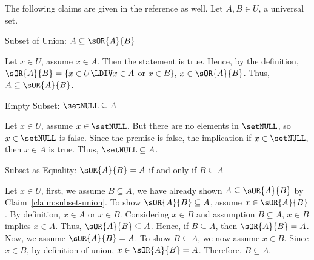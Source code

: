 \newpage

The following claims are given in the reference as well. Let $A,B\in U$, a universal set.

\begin{claim}{Subset of Union: $A \subseteq \sOR{A}{B}$}
  \label{claim:subset-union}
  \begin{subprove}[bluecolor]
      Let $x\in U$, assume $x\in A$. Then the statement  is true.
      Hence, by the definition, $\sOR{A}{B}=\{x\in U\LDIV x\in A$ or $x\in B\}$, $x\in \sOR{A}{B}$.
      Thus, $A \subseteq \sOR{A}{B}$.
  \end{subprove}
\end{claim}

\begin{claim}{Empty Subset: $\setNULL \subseteq A$}
  \label{claim:empty-subset}
  \begin{subprove}[bluecolor]
      Let $x\in U$, assume $x\in \setNULL$. But there are no elements in $\setNULL$, so
      $x\in \setNULL$ is false. Since the premise is false, the implication if $x\in \setNULL$,
      then $x\in A$ is true. Thus, $\setNULL \subseteq A$.
  \end{subprove}
\end{claim}

\begin{claim}{Subset as Equality: $\sOR{A}{B}=A$ if and only if $B\subseteq A$}
  \label{claim:subset-equality}
  \begin{subprove}[bluecolor]
      Let $x\in U$, first, we assume $B\subseteq A$, we have already shown
      $A \subseteq \sOR{A}{B}$ by Claim~\ref{claim:subset-union}. To show $\sOR{A}{B} \subseteq A$, assume $x\in \sOR{A}{B}$.
      By definition, $x\in A$ or $x\in B$. Considering $x\in B$ and assumption
      $B \subseteq A$, $x\in B$ implies $x\in A$. Thus, $\sOR{A}{B} \subseteq A$.
      Hence, if $B\subseteq A$, then $\sOR{A}{B} = A$. \vspace*{10px}\\
      Now, we assume $\sOR{A}{B}=A$. To show $B\subseteq A$, we now assume $x\in B$. Since $x\in B$, by definition
      of union, $x\in \sOR{A}{B} = A$. Therefore, $B\subseteq A$.
  \end{subprove}
\end{claim}